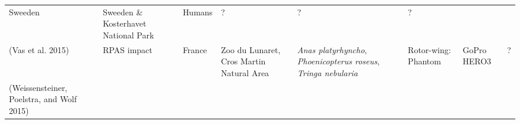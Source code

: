\documentclass[]{interact}
\theoremstyle{plain}%
\theoremstyle{definition}
\theoremstyle{remark}
\begin{document}
\begin{longtable}[]{@{}llllllll@{}}
\begin{minipage}[t]{0.03\columnwidth}
Sweeden\strut
\end{minipage} & \begin{minipage}[t]{0.14\columnwidth}\raggedright\strut
Sweeden \& Kosterhavet National Park\strut
\end{minipage} & \begin{minipage}[t]{0.10\columnwidth}\raggedright\strut
Humans\strut
\end{minipage} & \begin{minipage}[t]{0.09\columnwidth}\raggedright\strut
?\strut
\end{minipage} & \begin{minipage}[t]{0.11\columnwidth}\raggedright\strut
?\strut
\end{minipage} & \begin{minipage}[t]{0.01\columnwidth}\raggedright\strut
?\strut
\end{minipage}\tabularnewline
\begin{minipage}[t]{0.11\columnwidth}\raggedright\strut
(Vas et al. 2015)\strut
\end{minipage} & \begin{minipage}[t]{0.18\columnwidth}\raggedright\strut
RPAS impact\strut
\end{minipage} & \begin{minipage}[t]{0.03\columnwidth}\raggedright\strut
France\strut
\end{minipage} & \begin{minipage}[t]{0.14\columnwidth}\raggedright\strut
Zoo du Lunaret, Cros Martin Natural Area\strut
\end{minipage} & \begin{minipage}[t]{0.10\columnwidth}\raggedright\strut
\emph{Anas platyrhyncho}, \emph{Phoenicopterus roseus}, \emph{Tringa
nebularia}\strut
\end{minipage} & \begin{minipage}[t]{0.09\columnwidth}\raggedright\strut
Rotor-wing: Phantom\strut
\end{minipage} & \begin{minipage}[t]{0.11\columnwidth}\raggedright\strut
GoPro HERO3\strut
\end{minipage} & \begin{minipage}[t]{0.01\columnwidth}\raggedright\strut
?\strut
\end{minipage}\tabularnewline
\begin{minipage}[t]{0.11\columnwidth}\raggedright\strut
(Weissensteiner, Poelstra, and Wolf 2015)\strut
\end{minipage} & \begin{minipage}[t]{0.18\columnwidth}\raggedright\strut

\end{minipage}
\end{longtable}
\end{document}
